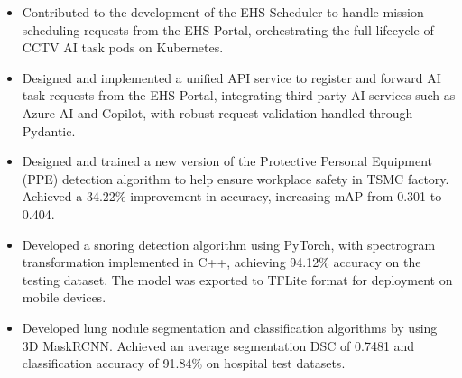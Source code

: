 \begin{cventries}
{\begin{cvitems}
        \begin{itemize}
            \item Contributed to the development of the EHS Scheduler to handle mission scheduling requests from the EHS Portal, 
            orchestrating the full lifecycle of CCTV AI task pods on Kubernetes.
        \end{itemize}
        \begin{itemize}
            \item Designed and implemented a unified API service to register and 
            forward AI task requests from the EHS Portal, integrating third-party 
            AI services such as Azure AI and Copilot, with robust request validation 
            handled through Pydantic.
        \end{itemize}
        \begin{itemize}
            \item Designed and trained a new version of the Protective Personal Equipment (PPE) detection algorithm to help ensure workplace safety in TSMC factory. 
            Achieved a 34.22\% improvement in accuracy, increasing mAP from 0.301 to 0.404.
        \end{itemize}
        \begin{itemize}
            \item Developed a snoring detection algorithm using PyTorch, with spectrogram transformation implemented in C++, achieving 
            94.12\% accuracy on the testing dataset. The model was exported to TFLite format for deployment on mobile devices.
        \end{itemize}
        \begin{itemize}
            \item Developed lung nodule segmentation and classification algorithms by using 3D MaskRCNN. Achieved an average segmentation DSC of 0.7481 and classification accuracy of 91.84\% on hospital test datasets. 
        \end{itemize}
    \end{cvitems}
}

\end{cventries}

